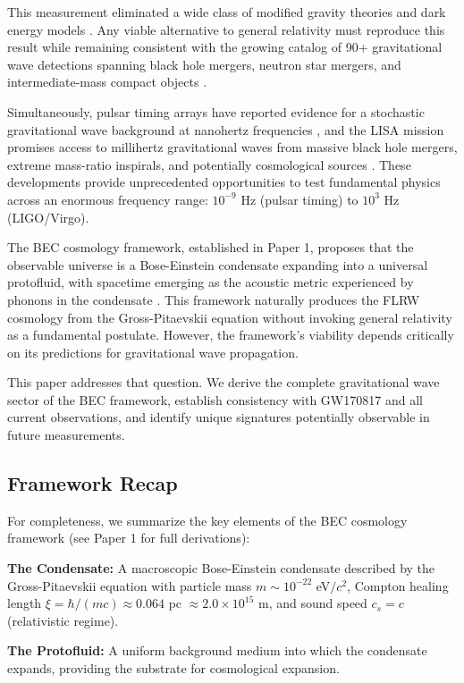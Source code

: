 \documentclass[11pt,a4paper]{article}
\newcommand{\cs}{\ensuremath{c_s}}
\theoremstyle{definition}
\theoremstyle{remark}
\begin{document}
This measurement eliminated a wide class of modified gravity theories and dark energy models \cite{Ezquiaga2018}. Any viable alternative to general relativity must reproduce this result while remaining consistent with the growing catalog of 90+ gravitational wave detections spanning black hole mergers, neutron star mergers, and intermediate-mass compact objects \cite{LIGOVirgo2021}.

Simultaneously, pulsar timing arrays have reported evidence for a stochastic gravitational wave background at nanohertz frequencies \cite{NANOGrav2023}, and the LISA mission promises access to millihertz gravitational waves from massive black hole mergers, extreme mass-ratio inspirals, and potentially cosmological sources \cite{LISA2017}. These developments provide unprecedented opportunities to test fundamental physics across an enormous frequency range: $10^{-9}$ Hz (pulsar timing) to $10^{3}$ Hz (LIGO/Virgo).

The BEC cosmology framework, established in Paper 1, proposes that the observable universe is a Bose-Einstein condensate expanding into a universal protofluid, with spacetime emerging as the acoustic metric experienced by phonons in the condensate \cite{Paper1}. This framework naturally produces the FLRW cosmology from the Gross-Pitaevskii equation without invoking general relativity as a fundamental postulate. However, the framework's viability depends critically on its predictions for gravitational wave propagation.

This paper addresses that question. We derive the complete gravitational wave sector of the BEC framework, establish consistency with GW170817 and all current observations, and identify unique signatures potentially observable in future measurements.

\subsection{Framework Recap}
\label{sec:framework_recap}

For completeness, we summarize the key elements of the BEC cosmology framework (see Paper 1 for full derivations):

\textbf{The Condensate:} A macroscopic Bose-Einstein condensate described by the Gross-Pitaevskii equation with particle mass $m \sim 10^{-22}$ eV$/c^2$, Compton healing length $\xi = \hbar/(mc) \approx 0.064$ pc $\approx 2.0 \times 10^{15}$ m, and sound speed $\cs = c$ (relativistic regime).

\textbf{The Protofluid:} A uniform background medium into which the condensate expands, providing the substrate for cosmological expansion.
\end{document}
